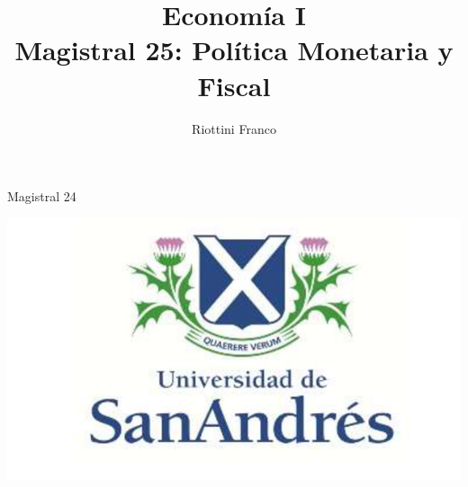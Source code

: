\documentclass{beamer}
\title[Economía I]{Economía I \vspace{4mm}
\\ Magistral 25: Política Monetaria y Fiscal}
\date{}
\author[Franco Riottini]{Riottini Franco}
\institute[]{Universidad de San Andrés}
\begin{document}
\begin{frame}
\titlepage
\centering
Magistral 24

\includegraphics[scale=0.2]{../Figures/logoUDESA.jpg} 
\end{frame}
\end{document}
